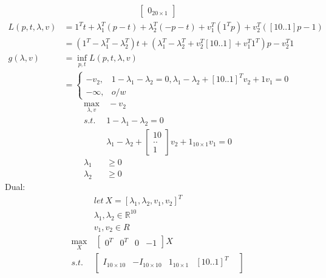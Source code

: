 \documentclass[12pt,letter]{article}
\newcommand{\R}{\mathbb{R}}
\begin{document}
\begin{enumerate}
\begin{enumerate}
\begin{align*}
                           \begin{bmatrix}
                             0_{20 \times 1}
                           \end{bmatrix}
    \end{align*}
    \pagebreak
    \begin{align*}
      L(p,t,\lambda,v) &= 1^T t + \lambda_1^T(p-t)+\lambda_2^T(-p-t)+v_1^T(1^Tp) + v_2^T([10..1]p-1)\\
                       &= (1^T-\lambda_1^T-\lambda_2^T)t+(\lambda_1^T-\lambda_2^T+v_2^T[10..1] + v_1^T1^T)p -v_2^T1\\
      g(\lambda,v) &= \inf_{p,t} L(p,t,\lambda,v)\\
                       &=
                         \begin{cases}
                           -v_2, & 1-\lambda_1-\lambda_2=0, \lambda_1-\lambda_2+[10..1]^T v_2 + 1v_1 =0\\
                           -\infty, & o/w
                         \end{cases}
    \end{align*}
    \begin{align*}
      \max_{\lambda,v}&\ -v_2\\
      s.t.\ &1-\lambda_1-\lambda_2 = 0\\
                      &\lambda_1-\lambda_2 +
                        \begin{bmatrix}
                          10 \\ ..\\ 1
                        \end{bmatrix}v_2 + 1_{10\times 1}v_1 = 0\\
      \lambda_1 &\geq 0\\
      \lambda_2 &\geq 0
    \end{align*}
    Dual:
    \begin{align*}
      &let\ X=[\lambda_1, \lambda_2, v_1, v_2]^T\\
      &\lambda_1, \lambda_2 \in \R^{10}\\
      &v_1,v_2 \in R\\
      \max_{X}&\
                \begin{bmatrix}
                  0^T & 0^T & 0 & -1
                \end{bmatrix}X\\
      s.t.\ &
              \begin{bmatrix}
                I_{10\times 10} & -I_{10\times 10} & 1_{10\times 1} & [10..1]^T& \\

\end{bmatrix}
\end{align*}
\end{enumerate}
\end{enumerate}
\end{document}
